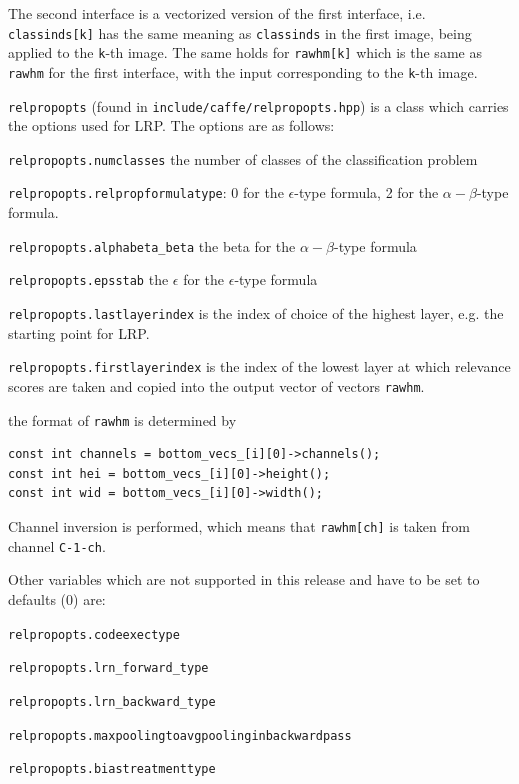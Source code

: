 \documentclass[a4wide]{article}
\begin{document}
\begin{itemize}
The second interface is a vectorized version of the first interface, i.e. \texttt{classinds[k]} has the same meaning as \texttt{classinds} in the first image, being applied to the \texttt{k}-th image. The same holds for \texttt{rawhm[k]} which is the same as \texttt{rawhm} for the first interface, with the input corresponding to the \texttt{k}-th image.

\texttt{relpropopts} (found in \texttt{include/caffe/relpropopts.hpp}) is a class which carries the options used for LRP. The options are as follows:

\texttt{relpropopts.numclasses} the number of classes of  the classification problem

\texttt{relpropopts.relpropformulatype}: 0 for the $\epsilon$-type formula, 2 for the $\alpha-\beta$-type formula.

\texttt{relpropopts.alphabeta\_beta} the beta for the $\alpha-\beta$-type formula

\texttt{relpropopts.epsstab} the $\epsilon$ for the $\epsilon$-type formula

\texttt{relpropopts.lastlayerindex} is the index of choice of the highest layer, e.g. the starting point for LRP.

\texttt{relpropopts.firstlayerindex} is the index of the lowest layer at which relevance scores are taken and copied into the output vector of vectors \texttt{rawhm}. 

the format of \texttt{rawhm} is determined by 
\begin{verbatim}
const int channels = bottom_vecs_[i][0]->channels();
const int hei = bottom_vecs_[i][0]->height();
const int wid = bottom_vecs_[i][0]->width();
\end{verbatim}

Channel inversion is performed, which means that \texttt{rawhm[ch]} is taken from channel \texttt{C-1-ch}.

Other variables which are not supported in this release and have to be set to defaults (0) are:

\texttt{relpropopts.codeexectype}

\texttt{relpropopts.lrn\_forward\_type}

\texttt{relpropopts.lrn\_backward\_type}

\texttt{relpropopts.maxpoolingtoavgpoolinginbackwardpass}

\texttt{relpropopts.biastreatmenttype}




\end{itemize}
\end{document}
